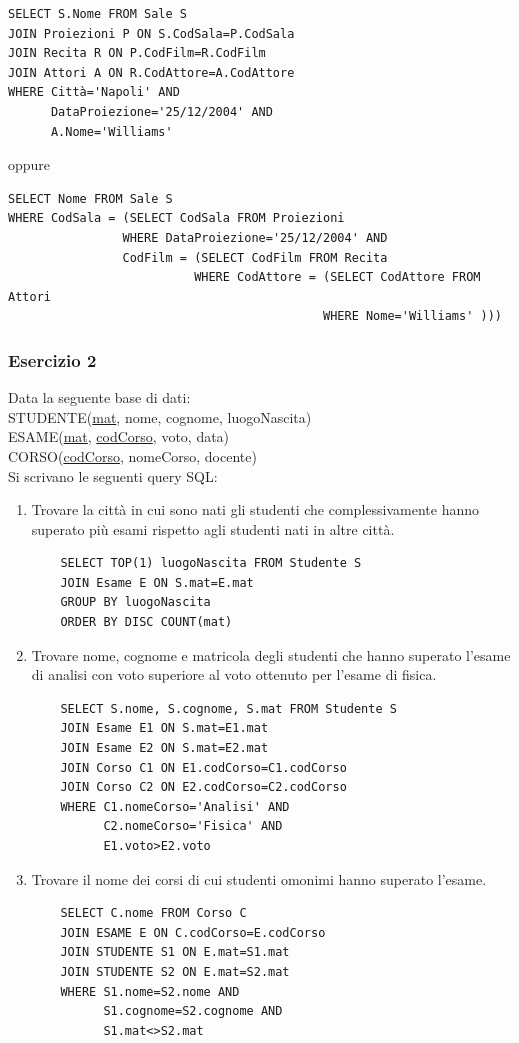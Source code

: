 \documentclass[a4paper]{article}
\begin{document}
\begin{enumerate}
\begin{verbatim}
SELECT S.Nome FROM Sale S
JOIN Proiezioni P ON S.CodSala=P.CodSala
JOIN Recita R ON P.CodFilm=R.CodFilm
JOIN Attori A ON R.CodAttore=A.CodAttore
WHERE Città='Napoli' AND
      DataProiezione='25/12/2004' AND
      A.Nome='Williams'
\end{verbatim}
oppure
\begin{verbatim}
SELECT Nome FROM Sale S
WHERE CodSala = (SELECT CodSala FROM Proiezioni
                WHERE DataProiezione='25/12/2004' AND
                CodFilm = (SELECT CodFilm FROM Recita
                          WHERE CodAttore = (SELECT CodAttore FROM Attori
                                            WHERE Nome='Williams' )))
\end{verbatim}
\end{enumerate}

\subsubsection{Esercizio 2}
Data la seguente base di dati:\medskip\\
STUDENTE(\underline{mat}, nome, cognome, luogoNascita)\\
ESAME(\underline{mat}, \underline{codCorso}, voto, data)\\
CORSO(\underline{codCorso}, nomeCorso, docente)\medskip\\
Si scrivano le seguenti query SQL:
\begin{enumerate}
  \item Trovare la città in cui sono nati gli studenti che complessivamente hanno superato più esami rispetto agli studenti nati in altre città.
  \begin{verbatim}
    SELECT TOP(1) luogoNascita FROM Studente S
    JOIN Esame E ON S.mat=E.mat
    GROUP BY luogoNascita
    ORDER BY DISC COUNT(mat)
  \end{verbatim}
  \item Trovare nome, cognome e matricola degli studenti che hanno superato l'esame di analisi con voto superiore al voto ottenuto per l'esame di fisica.
  \begin{verbatim}
    SELECT S.nome, S.cognome, S.mat FROM Studente S
    JOIN Esame E1 ON S.mat=E1.mat
    JOIN Esame E2 ON S.mat=E2.mat
    JOIN Corso C1 ON E1.codCorso=C1.codCorso
    JOIN Corso C2 ON E2.codCorso=C2.codCorso
    WHERE C1.nomeCorso='Analisi' AND
          C2.nomeCorso='Fisica' AND
          E1.voto>E2.voto
  \end{verbatim}
  \item Trovare il nome dei corsi di cui studenti omonimi hanno superato l'esame.
  \begin{verbatim}
    SELECT C.nome FROM Corso C
    JOIN ESAME E ON C.codCorso=E.codCorso
    JOIN STUDENTE S1 ON E.mat=S1.mat
    JOIN STUDENTE S2 ON E.mat=S2.mat
    WHERE S1.nome=S2.nome AND
          S1.cognome=S2.cognome AND
          S1.mat<>S2.mat
  \end{verbatim}
\end{enumerate}
\end{document}
